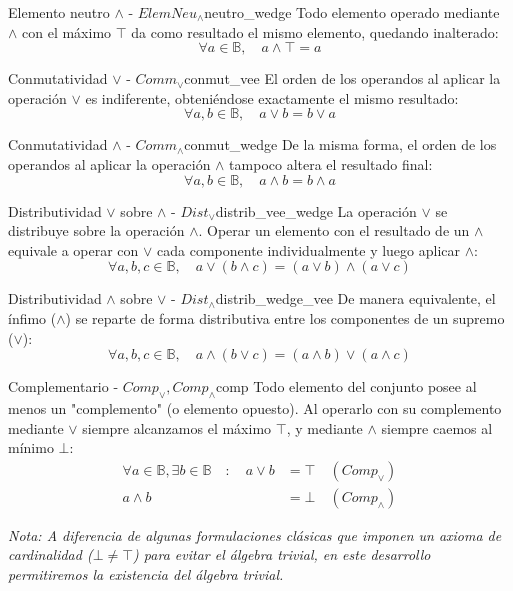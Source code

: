 \begin{postulado}{Elemento neutro $\wedge$ - $ElemNeu_\wedge$}{neutro_wedge}
Todo elemento operado mediante $\wedge$ con el máximo $\top$ da como resultado el mismo elemento, quedando inalterado:
\[ \forall a \in \mathbb{B}, \quad a \wedge \top = a \]
\end{postulado}

\begin{postulado}{Conmutatividad $\vee$ - $Comm_\vee$}{conmut_vee}
El orden de los operandos al aplicar la operación $\vee$ es indiferente, obteniéndose exactamente el mismo resultado:
\[ \forall a, b \in \mathbb{B}, \quad a \vee b = b \vee a \]
\end{postulado}

\begin{postulado}{Conmutatividad $\wedge$ - $Comm_\wedge$}{conmut_wedge}
De la misma forma, el orden de los operandos al aplicar la operación $\wedge$ tampoco altera el resultado final:
\[ \forall a, b \in \mathbb{B}, \quad a \wedge b = b \wedge a \]
\end{postulado}

\begin{postulado}{Distributividad $\vee$ sobre $\wedge$ - $Dist_\vee$}{distrib_vee_wedge}
La operación $\vee$ se distribuye sobre la operación $\wedge$. Operar un elemento con el resultado de un $\wedge$ equivale a operar con $\vee$ cada componente individualmente y luego aplicar $\wedge$:
\[ \forall a, b, c \in \mathbb{B}, \quad a \vee (b \wedge c) = (a \vee b) \wedge (a \vee c) \]
\end{postulado}

\begin{postulado}{Distributividad $\wedge$ sobre $\vee$ - $Dist_\wedge$}{distrib_wedge_vee}
De manera equivalente, el ínfimo ($\wedge$) se reparte de forma distributiva entre los componentes de un supremo ($\vee$):
\[ \forall a, b, c \in \mathbb{B}, \quad a \wedge (b \vee c) = (a \wedge b) \vee (a \wedge c) \]
\end{postulado}

\begin{postulado}{Complementario - $Comp_\vee, Comp_\wedge$}{comp}
Todo elemento del conjunto posee al menos un "complemento" (o elemento opuesto). Al operarlo con su complemento mediante $\vee$ siempre alcanzamos el máximo $\top$, y mediante $\wedge$ siempre caemos al mínimo $\bot$:
\begin{align*}
\forall a \in \mathbb{B}, \exists b \in \mathbb{B} \quad : \quad a \vee b &= \top \quad (Comp_\vee) \\
a \wedge b &= \bot \quad (Comp_\wedge)
\end{align*}
\end{postulado}

\textit{Nota: A diferencia de algunas formulaciones clásicas que imponen un axioma de cardinalidad ($\bot \neq \top$) para evitar el álgebra trivial, en este desarrollo permitiremos la existencia del álgebra trivial.}

